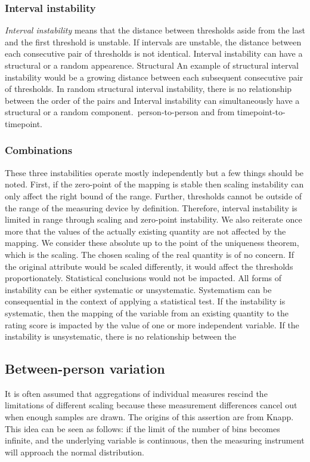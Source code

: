 \documentclass[utf8]{FrontiersinVancouver}
\begin{document}
\subsubsection{Interval instability}
\textit{Interval instability} means that the distance between thresholds aside from the last and the first threshold is unstable. If intervals are unstable, the distance between each consecutive pair of thresholds is not identical. Interval instability can have a structural or a random appearence. Structural  An example of structural interval instability would be a growing distance between each subsequent consecutive pair of thresholds. In random structural interval instability, there is no relationship between the order of the pairs and  Interval instability can simultaneously have a structural or a random component.\ \textitfrom person-to-person and from timepoint-to-timepoint. 

\subsubsection{Combinations}
These three instabilities operate mostly independently but a few things should be noted. First, if the zero-point of the mapping is stable then scaling instability can only affect the right bound of the range. Further, thresholds cannot be outside of the range of the measuring device by definition. Therefore, interval instability is limited in range through scaling and zero-point instability. We also reiterate once more that the values of the actually existing quantity are not affected by the mapping. We consider these absolute up to the point of the uniqueness theorem, which is the scaling. The chosen scaling of the real quantity is of no concern. If the original attribute would be scaled differently, it would affect the thresholds proportionately. Statistical conclusions would not be impacted. All forms of instability can be either systematic or unsystematic. Systematism can be consequential in the context of applying a statistical test. If the instability is systematic, then the mapping of the variable from an existing quantity to the rating score is impacted by the value of one or more independent variable. If the instability is unsystematic, there is no relationship between the 

\subsection{Between-person variation}
It is often assumed that aggregations of individual measures rescind the limitations of different scaling because these measurement differences cancel out when enough samples are drawn. The origins of this assertion are from Knapp. This idea can be seen as follows: if the limit of the number of bins becomes infinite, and the underlying variable is continuous, then the measuring instrument will approach the normal distribution. 
\end{document}

